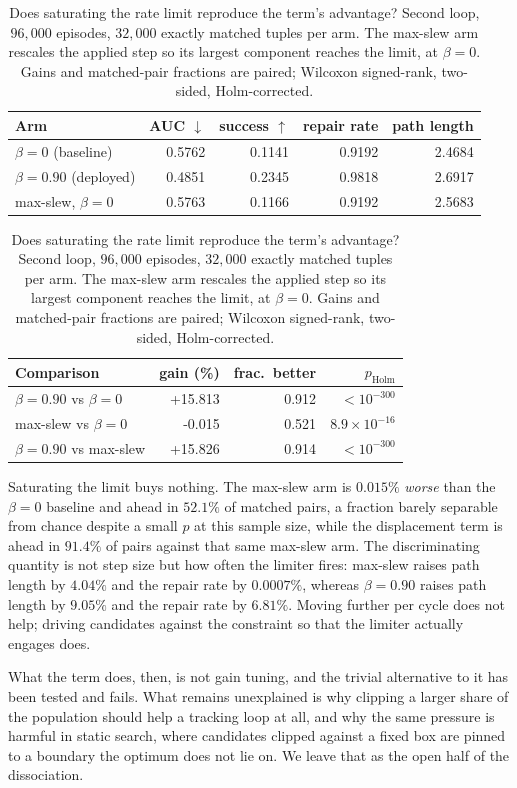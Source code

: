 \documentclass[11pt,a4paper]{article}
\begin{document}
\begin{table}[htbp]
\centering
\small
\caption{Does saturating the rate limit reproduce the term's advantage? Second loop,
$96{,}000$ episodes, $32{,}000$ exactly matched tuples per arm. The max-slew arm rescales the
applied step so its largest component reaches the limit, at $\beta = 0$. Gains and
matched-pair fractions are paired; Wilcoxon signed-rank, two-sided, Holm-corrected.}
\label{tab:maxslew}
\begin{tabular}{lrrrr}
\toprule
Arm & AUC $\downarrow$ & success $\uparrow$ & repair rate & path length \\
\midrule
$\beta = 0$ (baseline) & 0.5762 & 0.1141 & 0.9192 & 2.4684 \\
$\beta = 0.90$ (deployed) & 0.4851 & 0.2345 & 0.9818 & 2.6917 \\
max-slew, $\beta = 0$ & 0.5763 & 0.1166 & 0.9192 & 2.5683 \\
\bottomrule
\end{tabular}

\vspace{0.6em}
\begin{tabular}{lrrr}
\toprule
Comparison & gain (\%) & frac.\ better & $p_{\text{Holm}}$ \\
\midrule
$\beta = 0.90$ vs $\beta = 0$ & +15.813 & 0.912 & $<10^{-300}$ \\
max-slew vs $\beta = 0$ & -0.015 & 0.521 & $8.9 \times 10^{-16}$ \\
$\beta = 0.90$ vs max-slew & +15.826 & 0.914 & $<10^{-300}$ \\
\bottomrule
\end{tabular}
\end{table}

Saturating the limit buys nothing. The max-slew arm is $0.015\%$ \emph{worse} than the
$\beta = 0$ baseline and ahead in $52.1\%$ of matched pairs, a fraction barely separable from
chance despite a small $p$ at this sample size, while the displacement term is ahead in
$91.4\%$ of pairs against that same max-slew arm. The discriminating quantity is not step
size but how often the limiter fires: max-slew raises path length by $4.04\%$ and the repair
rate by $0.0007\%$, whereas $\beta = 0.90$ raises path length by $9.05\%$ and the repair rate
by $6.81\%$. Moving further per cycle does not help; driving candidates against the
constraint so that the limiter actually engages does.

What the term does, then, is not gain tuning, and the trivial alternative to it has been
tested and fails. What remains unexplained is why clipping a larger share of the population
should help a tracking loop at all, and why the same pressure is harmful in static search,
where candidates clipped against a fixed box are pinned to a boundary the optimum does not
lie on. We leave that as the open half of the dissociation.
\end{document}
